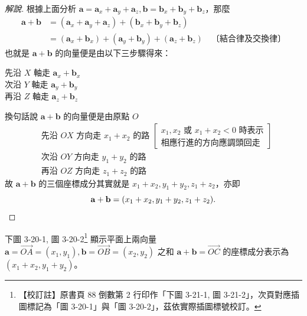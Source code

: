 \begin{proof}[解說]
根據上面分析 $\mathbf{a} = \mathbf{a}_x + \mathbf{a}_y + \mathbf{a}_z, \mathbf{b} = \mathbf{b}_x + \mathbf{b}_y + \mathbf{b}_z$，那麼
\begin{align*}
\mathbf{a} + \mathbf{b} &= (\mathbf{a}_x + \mathbf{a}_y + \mathbf{a}_z) + (\mathbf{b}_x + \mathbf{b}_y + \mathbf{b}_z) \\
&= (\mathbf{a}_x + \mathbf{b}_x) + (\mathbf{a}_y + \mathbf{b}_y) + (\mathbf{a}_z + \mathbf{b}_z) \quad \text{〔結合律及交換律〕}
\end{align*}
也就是 $\mathbf{a} + \mathbf{b}$ 的向量便是由以下三步驟得來：
\begin{center}
先沿 $X$ 軸走 $\mathbf{a}_x + \mathbf{b}_x$\\
次沿 $Y$ 軸走 $\mathbf{a}_y + \mathbf{b}_y$\\
再沿 $Z$ 軸走 $\mathbf{a}_z + \mathbf{b}_z$
\end{center}
換句話說 $\mathbf{a} + \mathbf{b}$ 的向量便是由原點 $O$
\begin{align*}
&\text{先沿 } OX \text{ 方向走 } x_1 + x_2 \text{ 的路 } \left[\begin{array}{l} x_1, x_2 \text{ 或 } x_1 + x_2 < 0 \text{ 時表示}\\ \text{相應行進的方向應調頭回走} \end{array}\right] \\
&\text{次沿 } OY \text{ 方向走 } y_1 + y_2 \text{ 的路} \\
&\text{再沿 } OZ \text{ 方向走 } z_1 + z_2 \text{ 的路}
\end{align*}
故 $\mathbf{a} + \mathbf{b}$ 的三個座標成分其實就是 $x_1 + x_2, y_1 + y_2, z_1 + z_2$，亦即
\[ \mathbf{a} + \mathbf{b} = (x_1 + x_2, y_1 + y_2, z_1 + z_2). \qedhere \]
\end{proof}

\label{note:b3s-ch3-p88-fig-ref}%
下圖 3-20-1, 圖 3-20-2\footnote{【校訂註】原書頁 88 倒數第 2 行印作「下圖 3-21-1, 圖 3-21-2」，次頁對應插圖標記為「圖 3-20-1」與「圖 3-20-2」，茲依實際插圖標號校訂。} 顯示平面上兩向量 $\mathbf{a} = \vec{OA} = (x_1, y_1), \mathbf{b} = \vec{OB} = (x_2, y_2)$ 之和 $\mathbf{a} + \mathbf{b} = \vec{OC}$ 的座標成分表示為 $(x_1 + x_2, y_1 + y_2)$。

